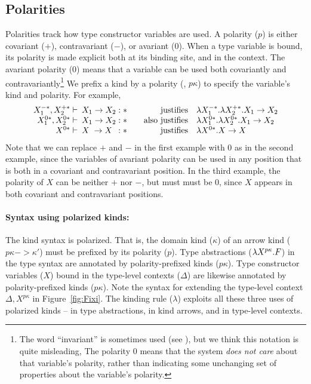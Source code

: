 \subsection{Polarities} \label{ssec:fixi:def:polarity}
Polarities track how type constructor variables are used.
A polarity ($p$) is either covariant ($+$), contravariant ($-$), or
avariant ($0$). When a type variable is bound, its polarity is 
made explicit both at its binding site, and in the context.
The avariant polarity ($0$) means that a variable can be used both
covariantly and contravariantly\footnote{
	The word ``invariant'' is sometimes used (see \cite{AbeMat04}),
	but we think this notation is quite misleading,
	The polarity $0$ means that the system \emph{does not care} about
	that variable's polarity, rather than indicating some
	unchanging set of properties about the variable's polarity.}
We prefix a kind  by a polarity (\ie, $p\kappa$) to specify the variable's
kind and polarity. For example,
\[
\begin{array}{rlrl}
X_1^{-*},X_2^{+*} |- \!\!\! & X_1 -> X_2 : *
	& ~~~\text{justifies} & \l X_1^{-*}.\l X_2^{+*}.X_1 -> X_2 \\
X_1^{0*},X_2^{0*} |- \!\!\! & X_1 -> X_2 : *
	& ~~~\text{also justifies} & \l X_1^{0*}.\l X_2^{0*}.X_1 -> X_2 \\
X^{0*} |- \!\!\! & X\phantom{_.} -> X\phantom{_2} : *
	& ~~~\text{justifies} & \l X^{0*}.X -> X
\end{array}
\]
Note that we can replace $+$ and $-$ in the first example with $0$
as in the second example, since the variables of avariant polarity can be used
in any position that is both in a covariant and contravariant position.
In the third example, the polarity of $X$ can be neither $+$ nor $-$, but must
must be $0$, since $X$ appears in both covariant and contravariant positions.

\paragraph{Syntax using polarized kinds:}
The kind syntax is polarized. That is, the domain kind ($\kappa$) of
an arrow kind ($p\kappa -> \kappa'$) must be prefixed by its polarity ($p$).
Type abstractions ($\lambda X^{p\kappa}.F$) in the type syntax are annotated by
polarity-prefixed kinds ($p\kappa$). Type constructor variables ($X$) bound
in the type-level contexts ($\Delta$) are likewise annotated by
polarity-prefixed kinds ($p\kappa$). Note the syntax for extending
the type-level context $\Delta,X^{p\kappa}$ in Figure~\ref{fig:Fixi}.
The kinding rule ($\lambda$) exploits all these three uses of polarized kinds
-- in type abstractions, in kind arrows, and in type-level contexts.

